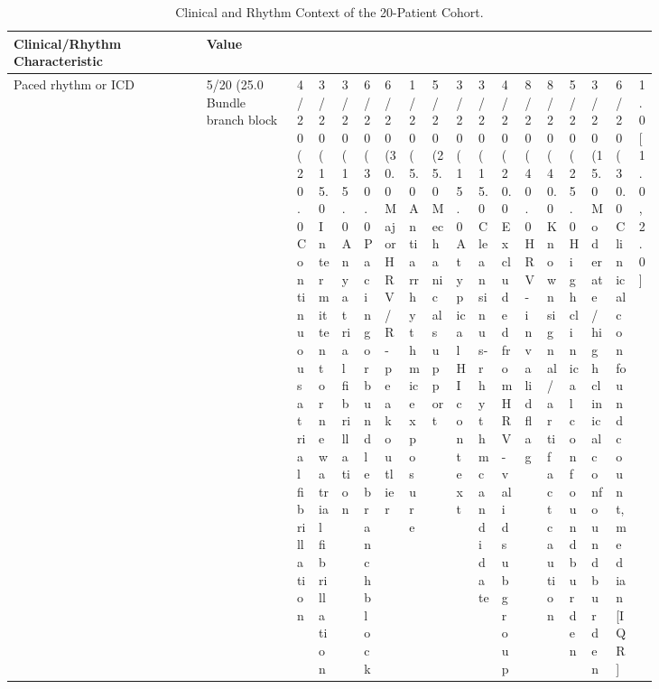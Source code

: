 \begin{table}
\caption{Clinical and Rhythm Context of the 20-Patient Cohort.}
\label{tab:clinical_rhythm_context}
\begin{tabular}{p{0.58\linewidth}p{0.25\linewidth}}
\toprule
Clinical/Rhythm Characteristic & Value \\
\midrule
Paced rhythm or ICD & 5/20 (25.0%
Bundle branch block & 4/20 (20.0%
Continuous atrial fibrillation & 3/20 (15.0%
Intermittent or new atrial fibrillation & 3/20 (15.0%
Any atrial fibrillation & 6/20 (30.0%
Pacing or bundle branch block & 6/20 (30.0%
Major HRV/R-peak outlier & 1/20 (5.0%
Antiarrhythmic exposure & 5/20 (25.0%
Mechanical support & 3/20 (15.0%
Atypical HI context & 3/20 (15.0%
Clean sinus-rhythm candidate & 4/20 (20.0%
Excluded from HRV-valid subgroup & 8/20 (40.0%
HRV-invalid flag & 8/20 (40.0%
Known signal/artifact caution & 5/20 (25.0%
High clinical confound burden & 3/20 (15.0%
Moderate/high clinical confound burden & 6/20 (30.0%
Clinical confound count, median [IQR] & 1.0 [1.0, 2.0] \\
\bottomrule
\end{tabular}
\end{table}
